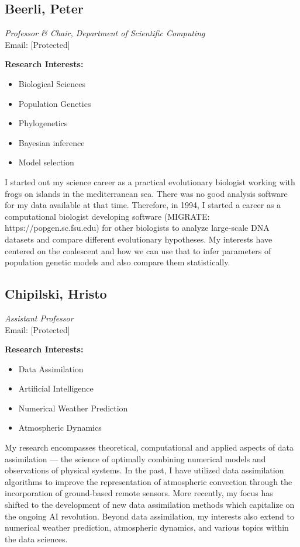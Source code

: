 \documentclass[12pt,a4paper]{article}
\begin{document}
\subsection{Beerli, Peter}
\textit{Professor \& Chair, Department of Scientific Computing} \\
Email: [Protected]

\textbf{Research Interests:}
\begin{itemize}
    \item Biological Sciences
    \item Population Genetics
    \item Phylogenetics
    \item Bayesian inference
    \item Model selection
\end{itemize}

I started out my science career as a practical evolutionary biologist working with frogs on islands in the mediterranean sea. There was no good analysis software for my data available at that time. Therefore, in 1994, I started a career as a computational biologist developing software (MIGRATE: https://popgen.sc.fsu.edu) for other biologists to analyze large-scale DNA datasets and compare different evolutionary hypotheses. My interests have centered on the coalescent and how we can use that to infer parameters of population genetic models and also compare them statistically.

\subsection{Chipilski, Hristo}
\textit{Assistant Professor} \\
Email: [Protected]

\textbf{Research Interests:}
\begin{itemize}
    \item Data Assimilation
    \item Artificial Intelligence
    \item Numerical Weather Prediction
    \item Atmospheric Dynamics
\end{itemize}

My research encompasses theoretical, computational and applied aspects of data assimilation — the science of optimally combining numerical models and observations of physical systems. In the past, I have utilized data assimilation algorithms to improve the representation of atmospheric convection through the incorporation of ground-based remote sensors. More recently, my focus has shifted to the development of new data assimilation methods which capitalize on the ongoing AI revolution. Beyond data assimilation, my interests also extend to numerical weather prediction, atmospheric dynamics, and various topics within the data sciences.
\end{document}
